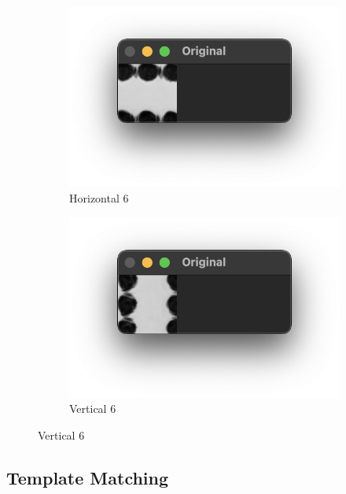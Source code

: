 \documentclass[12pt]{article}
\begin{document}
    \begin{figure}[!h]
        \ContinuedFloat
        \centering
        \begin{subfigure}{.5\textwidth}
            \centering
            \includegraphics[width=0.9\linewidth]{images/templates_no_preprocess/horizontal/6.png}
            \caption{Horizontal 6}
            \label{fig:tc-h6}
        \end{subfigure}%
        \begin{subfigure}{.5\textwidth}
            \centering
            \includegraphics[width=0.9\linewidth]
            {images/templates_no_preprocess/vertical/6.png}
            \caption{Vertical 6}
            \label{fig:tc-v6}
        \end{subfigure}
    \end{figure}

    \subsection{Template Matching}\label{subsec:template-matching}
\end{document}
